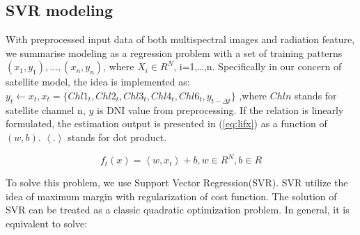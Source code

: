\documentclass[conference]{IEEEtran}
\begin{document}
% 
% 

\subsection{SVR modeling}
\label{subsec:SVR}

With preprocessed input data of both multispectral images and radiation feature,
we summarise modeling as a regression problem with a set of training
patterns $(x_{1},y_{1}),\ldots,(x_{n},y_{n})$, where $X_{i} \in R^{N}$,
i=1,\ldots,n.
Specifically in our concern of satellite model, the idea is implemented as:
$y_{t} \leftarrow x_{t}, x_{t}=\{Chl1_{t},Chl2_{t}, Chl3_{t}, Chl4_{t}, Chl6_{t}, y_{t-\Delta t}\}$
,where $Chln$ stands for satellite channel n, $y$ is DNI value from
preprocessing. If the relation is linearly formulated, the estimation output is
presented in (\ref{eq:lifx}) as a function of $(w,b)$. $\left \langle . \right
\rangle$ stands for dot product.

\begin{equation}
f_{t}(x)=\left \langle w,x_{t} \right \rangle + b ,w \in R^{N},b\in R
\label{eq:lifx}
\end{equation}

To solve this problem, we use Support Vector Regression(SVR). SVR utilize the
idea of maximum margin with regularization of cost function. The solution of SVR
can be treated as a classic quadratic optimization problem. In general, it is
equivalent to solve:
\end{document}
